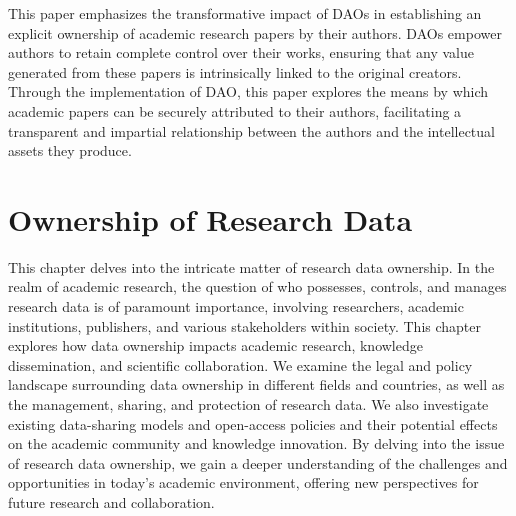 \documentclass[lettersize,journal]{IEEEtran}
\begin{document}
This paper emphasizes the transformative impact of DAOs in establishing an explicit ownership of academic research papers by their authors. DAOs empower authors to retain complete control over their works, ensuring that any value generated from these papers is intrinsically linked to the original creators. Through the implementation of DAO, this paper explores the means by which academic papers can be securely attributed to their authors, facilitating a transparent and impartial relationship between the authors and the intellectual assets they produce.

\section{Ownership of Research Data}

This chapter delves into the intricate matter of research data ownership. In the realm of academic research, the question of who possesses, controls, and manages research data is of paramount importance, involving researchers, academic institutions, publishers, and various stakeholders within society. This chapter explores how data ownership impacts academic research, knowledge dissemination, and scientific collaboration. We examine the legal and policy landscape surrounding data ownership in different fields and countries, as well as the management, sharing, and protection of research data. We also investigate existing data-sharing models and open-access policies and their potential effects on the academic community and knowledge innovation. By delving into the issue of research data ownership, we gain a deeper understanding of the challenges and opportunities in today's academic environment, offering new perspectives for future research and collaboration.
\end{document}

